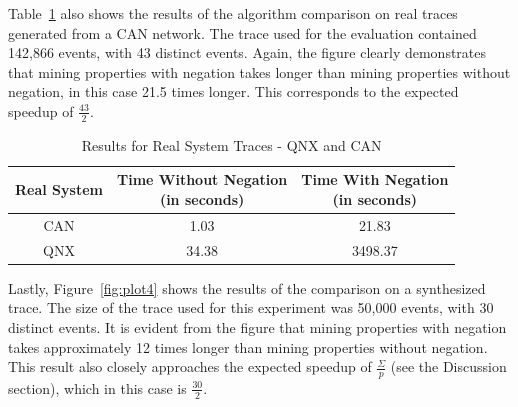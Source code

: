\documentclass[]{sigplanconf}
\begin{document}
Table~\ref{miningOverhead_time} also shows the results of the algorithm comparison on real traces generated from a CAN network. The trace used for the evaluation contained 142,866 events, with 43 distinct events. Again, the figure clearly demonstrates that mining properties with negation takes longer than mining properties without negation, in this case 21.5 times longer. This corresponds to the expected speedup of $\frac{43}{2}$.


\begin{table}[ht]
	\centering
	\begin{adjustbox}{max width=\columnwidth}
		\begin{tabular}{|c|c|c|}
			\hline
			\textbf{Real System} & \textbf{Time Without Negation \newline (in seconds)} & \textbf{Time With Negation \newline (in seconds)} \\
			\hline
			 CAN & 1.03 & 21.83 \\
			 \hline
			 QNX & 34.38 & 3498.37\\
			 \hline
		\end{tabular}
	\end{adjustbox}
	\caption{Results for Real System Traces - QNX and CAN}
	\label{miningOverhead_time}
\end{table}


Lastly, Figure~\ref{fig:plot4} shows the results of the comparison on a synthesized trace. The size of the trace used for this experiment was 50,000 events, with 30 distinct events. It is evident from the figure that mining properties with negation takes approximately 12 times longer than mining properties without negation. This result also closely approaches the expected speedup of $\frac{\Sigma}{p}$ (see the Discussion section), which in this case is $\frac{30}{2}$.







\end{document}

